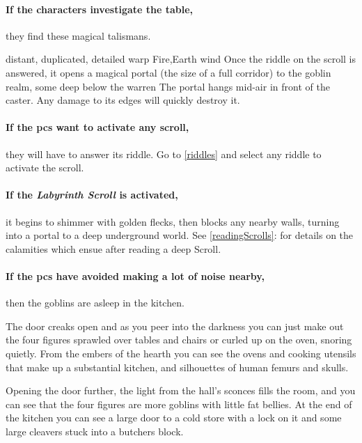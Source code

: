 \begin{multicols}{2}

\paragraph{If the characters investigate the table,}
they find these magical talismans.

\lootMagic

  {distant, duplicated, detailed}%
  {warp}%
  {Fire,Earth}%
  {wind}%
  {Once the riddle on the scroll is answered, it opens a magical portal (the size of a full corridor) to the goblin realm, some deep below the warren}%
  {The portal hangs mid-air in front of the caster.
  Any damage to its edges will quickly destroy it.}%

\paragraph{If the \glspl{pc} want to activate any scroll,}
they will have to answer its riddle.
Go to \autoref{riddles} and select any riddle to activate the scroll.

\paragraph{If the \textit{Labyrinth Scroll} is activated,}
it begins to shimmer with golden flecks, then blocks any nearby walls, turning into a portal to a deep underground world.
See \autoref{readingScrolls}:  for details on the calamities which ensue after reading a \gls{deep} Scroll.


\paragraph{If the \glspl{pc} have avoided making a lot of noise nearby,}
then the goblins are asleep in the kitchen.

\begin{boxtext}

  The door creaks open and as you peer into the darkness you can just make out the four figures sprawled over tables and chairs or curled up on the oven, snoring quietly.
  From the embers of the hearth you can see the ovens and cooking utensils that make up a substantial kitchen, and silhouettes of human femurs and skulls.

  Opening the door further, the light from the hall's sconces fills the room, and you can see that the four figures are more goblins with little fat bellies.
  At the end of the kitchen you can see a large door to a cold store with a lock on it and some large cleavers stuck into a butchers block.


\end{boxtext}
\end{multicols}
